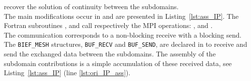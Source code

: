 \begin{enumerate}
recover the solution of continuity between the subdomains.
\\
%
The main modifications occur in  and are presented in Listing~\ref{lst:ass_IP}.
The Fortran subroutines ,  and 
call respectively the MPI operations:
,  and .\\
The communication corresponds to a non-blocking receive
with a blocking send.
The \texttt{BIEF\_MESH} structures, \texttt{BUF\_RECV} and \texttt{BUF\_SEND},
are declared in  to receive and send the
exchanged data between the subdomains.
The assembly of the subdomain contributions
is a simple accumulation of these received data,
see Listing~\ref{lst:ass_IP} (line \ref{lst:ori_IP_ass}).


\end{enumerate}
